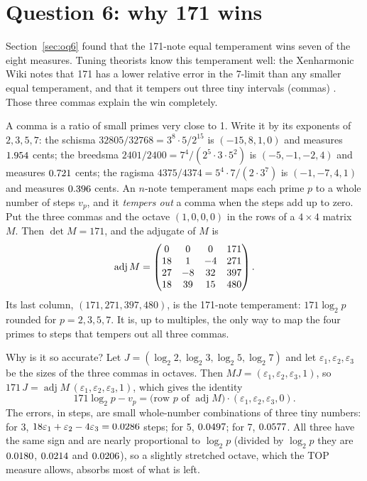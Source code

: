 \section{Question 6: why 171 wins}\label{sec:ob6}

Section~\ref{sec:oq6} found that the 171-note equal temperament wins seven of the eight measures. Tuning theorists know this temperament well: the Xenharmonic Wiki notes that 171 has a lower relative error in the 7-limit than any smaller equal temperament, and that it tempers out three tiny intervals (commas) \citep{Xen171,XenEnnealimmal}. Those three commas explain the win completely.

A comma is a ratio of small primes very close to 1. Write it by its exponents of $2, 3, 5, 7$: the schisma $32805/32768 = 3^8\cdot 5/2^{15}$ is $(-15, 8, 1, 0)$ and measures $1.954$ cents; the breedsma $2401/2400 = 7^4/(2^5\cdot 3\cdot 5^2)$ is $(-5, -1, -2, 4)$ and measures $0.721$ cents; the ragisma $4375/4374 = 5^4\cdot 7/(2\cdot 3^7)$ is $(-1, -7, 4, 1)$ and measures $0.396$ cents. An $n$-note temperament maps each prime $p$ to a whole number of steps $v_p$, and it \emph{tempers out} a comma when the steps add up to zero. Put the three commas and the octave $(1, 0, 0, 0)$ in the rows of a $4 \times 4$ matrix $M$. Then $\det M = 171$, and the adjugate of $M$ is
\[
  \operatorname{adj} M = \begin{pmatrix} 0 & 0 & 0 & 171\\18 & 1 & -4 & 271\\27 & -8 & 32 & 397\\18 & 39 & 15 & 480 \end{pmatrix}.
\]
Its last column, $(171, 271, 397, 480)$, is the 171-note temperament: $171\log_2 p$ rounded for $p = 2, 3, 5, 7$. It is, up to multiples, the only way to map the four primes to steps that tempers out all three commas.

Why is it so accurate? Let $J = (\log_2 2, \log_2 3, \log_2 5, \log_2 7)$ and let $\varepsilon_1, \varepsilon_2, \varepsilon_3$ be the sizes of the three commas in octaves. Then $MJ = (\varepsilon_1, \varepsilon_2, \varepsilon_3, 1)$, so $171\,J = \operatorname{adj}M\,(\varepsilon_1, \varepsilon_2, \varepsilon_3, 1)$, which gives the identity
\[
  171\log_2 p - v_p = \text{(row $p$ of $\operatorname{adj} M$)}\cdot(\varepsilon_1, \varepsilon_2, \varepsilon_3, 0).
\]
The errors, in steps, are small whole-number combinations of three tiny numbers: for 3, $18\varepsilon_1 + \varepsilon_2 - 4\varepsilon_3 = 0.0286$ steps; for 5, $0.0497$; for 7, $0.0577$. All three have the same sign and are nearly proportional to $\log_2 p$ (divided by $\log_2 p$ they are $0.0180$, $0.0214$ and $0.0206$), so a slightly stretched octave, which the TOP measure allows, absorbs most of what is left.

